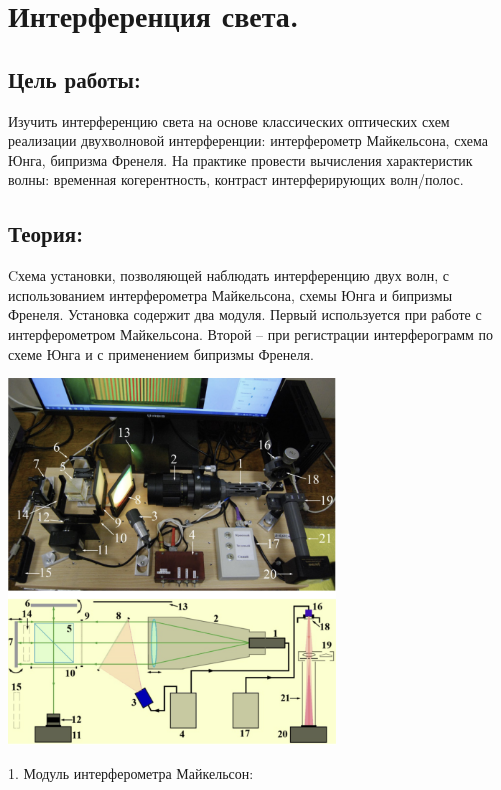 \documentclass[12pt, a4paper]{report}
\begin{document}
\chapter{Интерференция света. }

\section{Цель работы: }

Изучить интерференцию света на основе классических оптических схем реализации двухволновой интерференции:
интерферометр Майкельсона, схема Юнга, бипризма Френеля. На практике провести вычисления характеристик волны:
временная когерентность, контраст интерферирующих волн/полос.

\section{Теория: }

Cхема установки, позволяющей наблюдать интерференцию двух волн, с использованием интерферометра
Майкельсона, схемы Юнга и бипризмы Френеля. Установка содержит два модуля. Первый используется при работе с
интерферометром Майкельсона. Второй – при регистрации интерферограмм по схеме Юнга и с применением бипризмы
Френеля.

\begin{center}
    \includegraphics[width=0.65\textwidth]{image/1.png}
\end{center}

\newpage

\begin{flushleft}
    1. Модуль интерферометра Майкельсон:
\end{flushleft}
\end{document}
